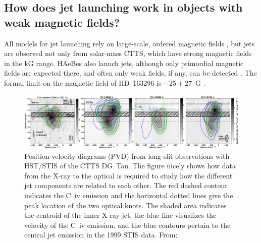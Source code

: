 \documentclass[12pt]{article}
\begin{document}
\subsection{How does jet launching work in objects with weak magnetic fields?}
All models for jet launching rely on large-scale, ordered magnetic fields \citep{2009ASSP...13...99F}, but jets are observed not only from solar-mass CTTS, which have strong magnetic fields in the kG range. HAeBes also launch jets, although only primordial magnetic fields are expected there, and often only weak fields, if any, can be detected \citep{2007A&A...463.1039H,2007MNRAS.376.1145W}. The formal limit on the magnetic field of HD~163296 is $-25\pm 27$~G \citep{2007A&A...463.1039H}. 


\begin{figure}[htb]
\centering
\includegraphics[width=\textwidth]{aa18592-11-fig2.png}
\caption{Position-velocity diagrams (PVD) from long-slit observations with HST/STIS of the CTTS DG~Tau. The figure nicely shows how data from the X-ray to the optical is required to study how the different jet components are related to each other. The red dashed contour indicates the C~{\sc iv} emission and the horizontal dotted lines give the peak location of the two optical knots. The shaded area indicates the centroid of the inner X-ray jet, the blue line visualizes the velocity of the C~{\sc iv} emission, and the blue contours pertain to the central jet emission in the 1999 STIS data. From:}
\label{fig:CIV}
\end{figure}
\end{document}
